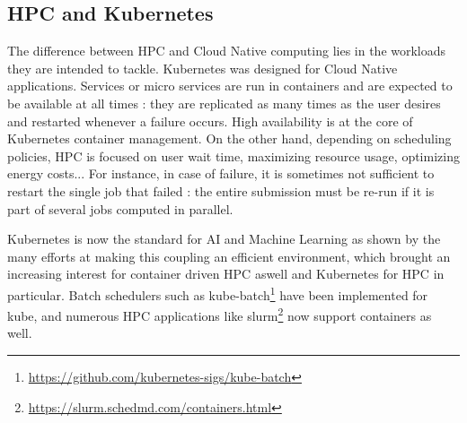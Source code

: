 \documentclass[12pt, a4paper]{memoir}
\begin{document}
\newpage %
\subsection{HPC and Kubernetes}
The difference between HPC and Cloud Native computing lies in the workloads
they are intended to tackle.  Kubernetes was designed for Cloud Native
applications. Services or micro services are run in containers and are expected
to be available at all times : they are replicated as many times as the user
desires and restarted whenever a failure occurs. High availability is at the
core of Kubernetes container management.  On the other hand, depending on
scheduling policies, HPC is focused on user wait time, maximizing resource
usage, optimizing energy costs... For instance, in case of failure, it is
sometimes not sufficient to restart the single job that failed : the entire
submission must be re-run if it is part of several jobs computed in parallel.

Kubernetes is now the standard for AI and Machine Learning as shown by the many
efforts at making this coupling an efficient
environment\cite{lee2017design}\cite{233001}\cite{10.1145/3154842.3154845},
which brought an increasing interest for container driven HPC aswell and
Kubernetes for HPC in particular. Batch schedulers such as
kube-batch\footnote{\url{https://github.com/kubernetes-sigs/kube-batch}} have
been implemented for kube, and numerous HPC applications like
slurm\footnote{\url{https://slurm.schedmd.com/containers.html}} now support containers as well.
\end{document}
